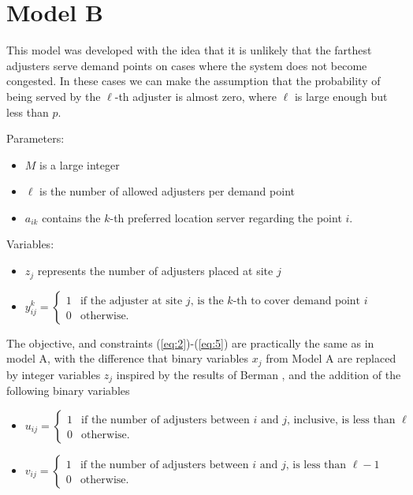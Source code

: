 
\section{Model B}

This model
was developed with the idea
that it is unlikely that the farthest adjusters
serve demand points
on cases where the system does not become congested.
In these cases
we can make the assumption that
the probability of being served by the $\ell$-th 
adjuster is almost zero,
where $\ell$ is large enough but less than $p$.

Parameters:
\begin{itemize}
\item $M$ is a large integer
\item $\ell$ is the number of allowed adjusters per demand point
\item $a_{ik}$ contains the $k$-th preferred location server
  regarding the point $i$.
\end{itemize}

Variables:
\begin{itemize}
\item $z_j$ represents the number of adjusters placed at site $j$
\item $y_{ij}^k =
  \begin{cases} 
    1 & \mbox{if the adjuster at site } j \mbox{, is the }
    k\mbox{-th to cover demand point } i \\
    0 & \mbox{otherwise.}
  \end{cases}$
\end{itemize}

The objective,
and constraints (\ref{eq:2})-(\ref{eq:5})
are practically the same as in model A,
with the difference that
binary variables $x_j$ from Model A
are replaced by integer variables $z_j$
inspired by the results of Berman \cite{berman1987stochastic},
and the addition of the following binary variables
\begin{itemize}
\item $u_{ij} = 
  \begin{cases}
    1 & \mbox{if the number of adjusters between } i 
    \mbox{ and } j \mbox{, inclusive, is less than } \ell \\
    0 & \mbox{otherwise.}
  \end{cases}$
\item $v_{ij} = 
  \begin{cases} 
    1 & \mbox{if the number of adjusters between } i
    \mbox{ and } j \mbox{, is less than } \ell - 1 \\
    0 & \mbox{otherwise.}
  \end{cases}$
\end{itemize}

